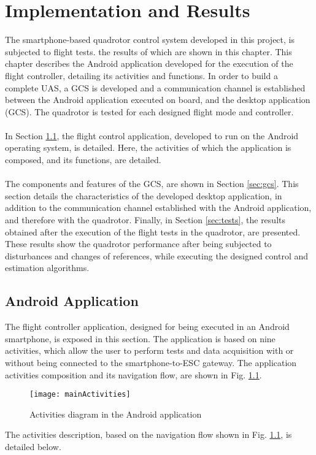 \chapter{Implementation and Results} \label{ch:implementation}
The smartphone-based quadrotor control system developed in this project, is subjected to flight tests. the results of which are shown in this chapter. This chapter describes the Android application developed for the execution of the flight controller, detailing its activities and functions. In order to build a complete UAS, a GCS is developed and a communication channel is established between the Android application executed on board, and the desktop application (GCS). The quadrotor is tested for each designed flight mode and controller.
\\\\
In Section \ref{sec:app}, the flight control application, developed to run on the Android operating system, is detailed. Here, the activities of which the application is composed, and its functions, are detailed.
\\\\
The components and features of the GCS, are shown in Section \ref{sec:gcs}. This section details the characteristics of the developed desktop application, in addition to the communication channel established with the Android application, and therefore with the quadrotor. Finally, in Section \ref{sec:tests}, the results obtained after the execution of the flight tests in the quadrotor, are presented. These results show the quadrotor performance after being subjected to disturbances and changes of references, while executing the designed control and estimation algorithms.

\section{Android Application} \label{sec:app}
The flight controller application, designed for being executed in an Android smartphone, is exposed in this section. The application is based on nine activities, which allow the user to perform tests and data acquisition with or without being connected to the smartphone-to-ESC gateway. The application activities composition and its navigation flow, are shown in Fig. \ref{fig:mainActivities}.
\begin{figure}[H]
\begin{center}
\texttt{[image: mainActivities]}  
\caption{Activities diagram in the Android application} 
\label{fig:mainActivities}
\end{center}
\end{figure}
The activities description, based on the navigation flow shown in Fig. \ref{fig:mainActivities}, is detailed below.

